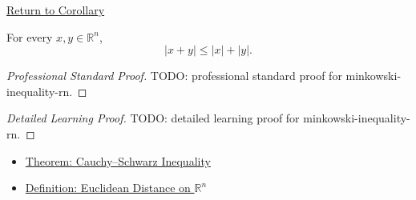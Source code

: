 \newpage
{}
\label{prf:minkowski-inequality-rn}

\begin{remark*}[Return]
\hyperref[cor:minkowski-inequality-rn]{Return to Corollary}
\end{remark*}

\begin{corollary*}
For every \(x,y\in\mathbb{R}^n\),
\[
  |x+y|\leq |x|+|y|.
\]
\end{corollary*}

\begin{proof}[Professional Standard Proof]
\LRAProofBodyStart
TODO: professional standard proof for minkowski-inequality-rn.
\end{proof}

\begin{proof}[Detailed Learning Proof]
\LRAProofBodyStart
TODO: detailed learning proof for minkowski-inequality-rn.
\end{proof}

\begin{remark*}
\end{remark*}

\begin{dependencies}
\begin{itemize}
  \item \hyperref[thm:cauchy-schwarz-inequality]{Theorem: Cauchy--Schwarz Inequality}
  \item \hyperref[def:euclidean-distance-rn]{Definition: Euclidean Distance on \(\mathbb{R}^n\)}
\end{itemize}
\end{dependencies}

\clearpage

